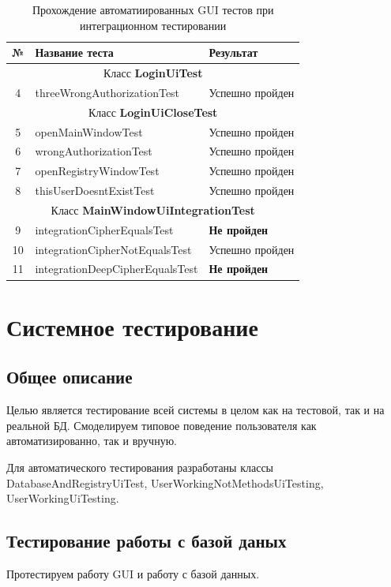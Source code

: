 \documentclass[a4paper,12pt]{article}
\begin{document}
\begin{table}[h!]
	\caption{Прохождение автоматиированных GUI тестов при интеграционном тестировании}
	\centering
	\begin{tabular}{|c|l|l|}
	\hline 
	№ &  Название теста & Результат \\ 
	\hline 
	\multicolumn{3}{|c|}{Класс \textbf{LoginUiTest}}\\
	\hline
	4 & threeWrongAuthorizationTest & Успешно пройден  \\
	\hline 
	\multicolumn{3}{|c|}{Класс \textbf{LoginUiCloseTest}}\\
	\hline
	5 & openMainWindowTest & Успешно пройден  \\
	\hline
	6 & wrongAuthorizationTest & Успешно пройден  \\
	\hline
	7 & openRegistryWindowTest & Успешно пройден  \\
	\hline
	8 & thisUserDoesntExistTest & Успешно пройден  \\
	\hline 
	\multicolumn{3}{|c|}{Класс \textbf{MainWindowUiIntegrationTest}}\\
	\hline 
	9 & integrationCipherEqualsTest & \textbf{Не пройден}  \\
	\hline
	10 & integrationCipherNotEqualsTest & Успешно пройден  \\
	\hline
	11 & integrationDeepCipherEqualsTest &  \textbf{Не пройден}  \\
	\hline
\end{tabular} 
\label{table:modul_testing_gui} 
\end{table}

\newpage \section{Системное тестирование}
\subsection{Общее описание}
Целью является тестирование всей системы в целом как на тестовой, так и на реальной БД.
Смоделируем типовое поведение пользователя как автоматизированно, так и вручную.

Для автоматического тестирования разработаны классы DatabaseAndRegistryUiTest, UserWorkingNotMethodsUiTesting, UserWorkingUiTesting.

\newpage \subsection{Тестирование работы с базой даных}
Протестируем работу GUI и работу с базой данных.  
\end{document}
